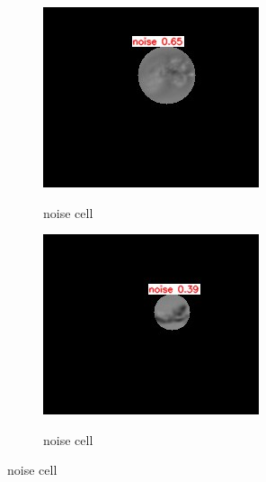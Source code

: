 \begin{figure}[t]
\begin{center}
		\begin{subfigure}[b]{0.25\textwidth}
			\includegraphics[width=\textwidth]{thesis-template-master/images/bestweightonnoise1.jpg}
			\label{fig:Contaminated}
			\caption{noise cell}
		\end{subfigure}
		\begin{subfigure}[b]{0.25\textwidth}
			\includegraphics[width=\textwidth]{thesis-template-master/images/bestweightonnoise2.jpg}
			\label{fig:Good Cell}
			\caption{noise cell}
		\end{subfigure}

\end{center}
\end{figure}
